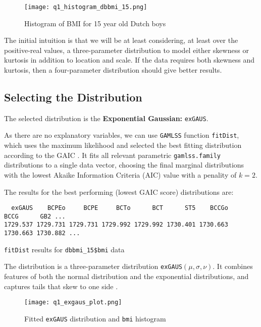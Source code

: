 \begin{figure}[H]
  \texttt{[image: q1\_histogram\_dbbmi\_15.png]}
  \caption{Histogram of BMI for 15 year old Dutch boys \cite{Fredriks:2000}}
\end{figure}
  
The initial intuition is that we will be at least considering, at least over the positive-real values,
a three-parameter distribution to model either skewness or kurtosis in
addition to location and scale.  If the data
requires both skewness and kurtosis, then a four-parameter distribution should give better
results.

\subsection{Selecting the Distribution}

The selected distribution is the \textbf{Exponential Gaussian:} \verb|exGAUS|.

As there are no explanatory variables, we can use \verb|GAMLSS| function \verb|fitDist|, which uses the
maximum likelihood and selected the best fitting distribution according to the GAIC \cite{Rigby:2019}.  It
fits all relevant parametric \verb|gamlss.family| distributions
to a single data vector, choosing the final marginal distributions with the lowest
Akaike Information Criteria (AIC) value with a penality of $k=2$.

The results for the best performing (lowest GAIC score) distributions are:

\begin{table}[!ht]
\begin{verbatim}
  exGAUS    BCPEo     BCPE     BCTo      BCT      ST5    BCCGo     BCCG      GB2 ...
1729.537 1729.731 1729.731 1729.992 1729.992 1730.401 1730.663 1730.663 1730.882 ...
\end{verbatim}
\caption {\texttt{fitDist} results for \texttt{dbbmi\_15\$bmi} data}
\end{table}

The distribution is a three-parameter distribution \verb|exGAUS|$(\mu, \sigma, \nu)$.  It combines features
of both the normal distribution and the exponential distributions, and captures tails that skew to one
side \cite{Rigby:2019}.  

\begin{figure}[H]
  \texttt{[image: q1\_exgaus\_plot.png]}
  \caption{Fitted \texttt{exGAUS} distribution and \texttt{bmi} histogram}
\end{figure}


